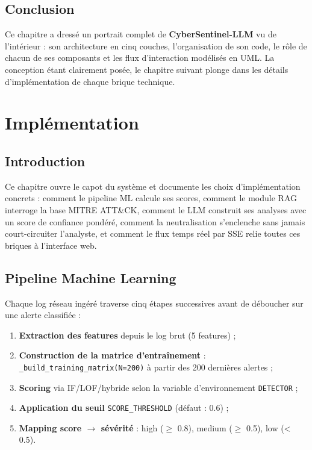 \documentclass[12pt,a4paper]{report}
\begin{document}
\section*{Conclusion}
\begin{onehalfspace}
Ce chapitre a dressé un portrait complet de \textbf{CyberSentinel-LLM} vu
de l'intérieur : son architecture en cinq couches, l'organisation de son code,
le rôle de chacun de ses composants et les flux d'interaction modélisés en UML.
La conception étant clairement posée, le chapitre suivant plonge dans les
détails d'implémentation de chaque brique technique.
\end{onehalfspace}

\newpage

\chapter{Implémentation}

\section*{Introduction}
\begin{onehalfspace}
Ce chapitre ouvre le capot du système et documente les choix
d'implémentation concrets : comment le pipeline ML calcule ses scores,
comment le module RAG interroge la base MITRE ATT\&CK, comment le LLM
construit ses analyses avec un score de confiance pondéré, comment la
neutralisation s'enclenche sans jamais court-circuiter l'analyste, et
comment le flux temps réel par SSE relie toutes ces briques à l'interface
web.
\end{onehalfspace}

\section{Pipeline Machine Learning}
\begin{onehalfspace}
Chaque log réseau ingéré traverse cinq étapes successives avant de
déboucher sur une alerte classifiée :

\begin{enumerate}
  \item \textbf{Extraction des features} depuis le log brut (5 features) ;
  \item \textbf{Construction de la matrice d'entraînement} :
  \texttt{\_build\_training\_matrix(N=200)} à partir des 200 dernières alertes ;
  \item \textbf{Scoring} via IF/LOF/hybride selon la variable
  d'environnement \texttt{DETECTOR} ;
  \item \textbf{Application du seuil} \texttt{SCORE\_THRESHOLD} (défaut : 0.6) ;
  \item \textbf{Mapping score $\rightarrow$ sévérité} : high ($\geq$ 0.8),
  medium ($\geq$ 0.5), low (< 0.5).
\end{enumerate}
\end{onehalfspace}
\end{document}

